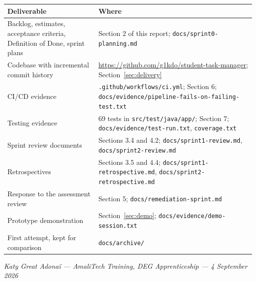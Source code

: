 \documentclass[11pt,a4paper]{article}
\newcommand{\code}[1]{\texttt{\small #1}}
\begin{document}
\begin{table}[h]
\centering
\small
\begin{tabularx}{\textwidth}{@{}L{4.4cm} X@{}}
\toprule
\textbf{Deliverable} & \textbf{Where} \\
\midrule
Backlog, estimates, acceptance criteria, Definition of Done, sprint plans
  & Section 2 of this report; \code{docs/sprint0-planning.md} \\
Codebase with incremental commit history
  & \url{https://github.com/g1kdo/student-task-manager}; Section~\ref{sec:delivery} \\
CI/CD evidence
  & \code{.github/workflows/ci.yml}; Section 6;
    \code{docs/evidence/pipeline-fails-on-failing-test.txt} \\
Testing evidence
  & 69 tests in \code{src/test/java/app/}; Section 7;
    \code{docs/evidence/test-run.txt}, \code{coverage.txt} \\
Sprint review documents
  & Sections 3.4 and 4.2; \code{docs/sprint1-review.md},
    \code{docs/sprint2-review.md} \\
Retrospectives
  & Sections 3.5 and 4.4; \code{docs/sprint1-retrospective.md},
    \code{docs/sprint2-retrospective.md} \\
Response to the assessment review
  & Section 5; \code{docs/remediation-sprint.md} \\
Prototype demonstration
  & Section~\ref{sec:demo}; \code{docs/evidence/demo-session.txt} \\
First attempt, kept for comparison
  & \code{docs/archive/} \\
\bottomrule
\end{tabularx}
\end{table}

\vfill
\begin{center}
\small
\textit{Katy Great Adona\"i --- AmaliTech Training, DEG Apprenticeship ---
4 September 2026}
\end{center}
\end{document}
